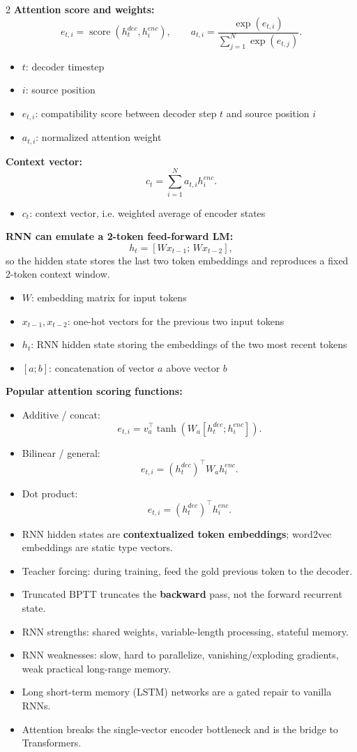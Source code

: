 \documentclass[10pt]{article}
\newenvironment{symdefs}{\begin{itemize}[leftmargin=1.1em, topsep=1pt, itemsep=0pt, parsep=0pt]}{\end{itemize}}
\newcommand{\sym}[2]{\item \textbf{#1}: #2}
\begin{document}
\begin{multicols*}{2}
\textbf{Attention score and weights:}
\[
e_{t,i}=\operatorname{score}(h_t^{dec}, h_i^{enc}),
\qquad
a_{t,i}=\frac{\exp(e_{t,i})}{\sum_{j=1}^{N}\exp(e_{t,j})}.
\]
\begin{symdefs}
\sym{\(t\)}{decoder timestep}
\sym{\(i\)}{source position}
\sym{\(e_{t,i}\)}{compatibility score between decoder step \(t\) and source position \(i\)}
\sym{\(a_{t,i}\)}{normalized attention weight}
\end{symdefs}

\textbf{Context vector:}
\[
c_t=\sum_{i=1}^{N} a_{t,i} h_i^{enc}.
\]
\begin{symdefs}
\sym{\(c_t\)}{context vector, i.e. weighted average of encoder states}
\end{symdefs}

\textbf{RNN can emulate a 2-token feed-forward LM:}
\[
h_t=[Wx_{t-1};\,Wx_{t-2}],
\]
so the hidden state stores the last two token embeddings and reproduces a fixed 2-token context window.
\begin{symdefs}
\sym{\(W\)}{embedding matrix for input tokens}
\sym{\(x_{t-1}, x_{t-2}\)}{one-hot vectors for the previous two input tokens}
\sym{\(h_t\)}{RNN hidden state storing the embeddings of the two most recent tokens}
\sym{\([a;b]\)}{concatenation of vector \(a\) above vector \(b\)}
\end{symdefs}

\textbf{Popular attention scoring functions:}
\begin{itemize}
\item Additive / concat:
\[
e_{t,i}=v_a^\top \tanh\!\left(W_a[h_t^{dec}; h_i^{enc}]\right).
\]
\item Bilinear / general:
\[
e_{t,i}=(h_t^{dec})^\top W_a h_i^{enc}.
\]
\item Dot product:
\[
e_{t,i}=(h_t^{dec})^\top h_i^{enc}.
\]
\end{itemize}

\begin{itemize}
\item RNN hidden states are \textbf{contextualized token embeddings}; word2vec embeddings are static type vectors.
\item Teacher forcing: during training, feed the gold previous token to the decoder.
\item Truncated BPTT truncates the \textbf{backward} pass, not the forward recurrent state.
\item RNN strengths: shared weights, variable-length processing, stateful memory.
\item RNN weaknesses: slow, hard to parallelize, vanishing/exploding gradients, weak practical long-range memory.
\item Long short-term memory (LSTM) networks are a gated repair to vanilla RNNs.
\item Attention breaks the single-vector encoder bottleneck and is the bridge to Transformers.
\end{itemize}


\end{multicols*}
\end{document}
